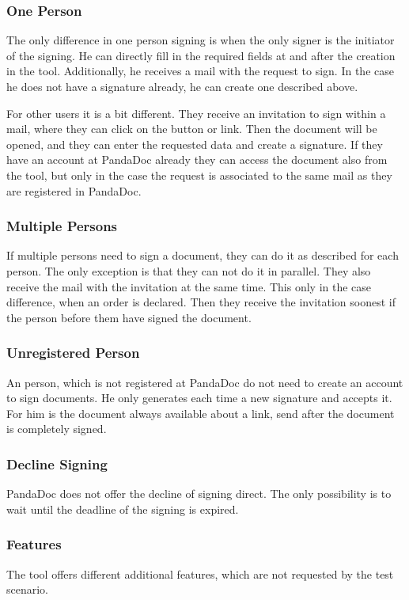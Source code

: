 \subsubsection{One Person}
The only difference in one person signing is when the only signer is the initiator of the signing. He can directly fill in the required fields at and after the creation in the tool. Additionally, he receives a mail with the request to sign. In the case he does not have a signature already, he can create one described above.

For other users it is a bit different. They receive an invitation to sign within a mail, where they can click on the button or link. Then the document will be opened, and they can enter the requested data and create a signature. If they have an account at PandaDoc already they can access the document also from the tool, but only in the case the request is associated to the same mail as they are registered in PandaDoc. 

\subsubsection{Multiple Persons}
If multiple persons need to sign a document, they can do it as described for each person. The only exception is that they can not do it in parallel. They also receive the mail with the invitation at the same time. This only in the case difference, when an order is declared. Then they receive the invitation soonest if the person before them have signed the document.

\subsubsection{Unregistered Person}
An person, which is not registered at PandaDoc do not need to create an account to sign documents. He only generates each time a new signature and accepts it. For him is the document always available about a link, send after the document is completely signed.  

\subsubsection{Decline Signing}
PandaDoc does not offer the decline of signing direct. The only possibility is to wait until the deadline of the signing is expired.

\subsubsection{Features}
The tool offers different additional features, which are not requested by the test scenario.

